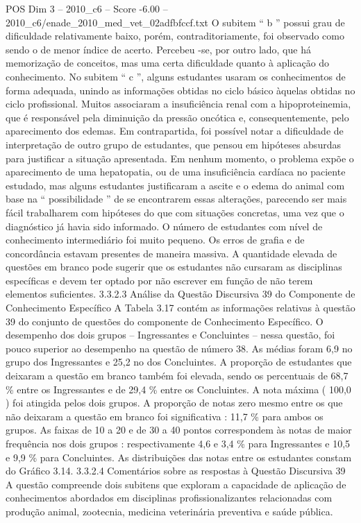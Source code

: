 \begin{textsample}{POS Dim 3 – 2010\_c6 – Score -6.00 – 2010\_c6/enade\_2010\_med\_vet\_02adfbfccf.txt}
O subitem “ b ” possui grau de dificuldade relativamente baixo, porém, contraditoriamente, foi observado como sendo o de menor índice de acerto.
Percebeu -se, por outro lado, que há memorização de conceitos, mas uma certa dificuldade quanto à aplicação do conhecimento.
No subitem “ c ”, alguns estudantes usaram os conhecimentos de forma adequada, unindo as informações obtidas no ciclo básico àquelas obtidas no ciclo profissional.
Muitos associaram a insuficiência renal com a hipoproteinemia, que é responsável pela diminuição da pressão oncótica e, consequentemente, pelo aparecimento dos edemas.
Em contrapartida, foi possível notar a dificuldade de interpretação de outro grupo de estudantes, que pensou em hipóteses absurdas para justificar a situação apresentada.
Em nenhum momento, o problema expõe o aparecimento de uma hepatopatia, ou de uma insuficiência cardíaca no paciente estudado, mas alguns estudantes justificaram a ascite e o edema do animal com base na “ possibilidade ” de se encontrarem essas alterações, parecendo ser mais fácil trabalharem com hipóteses do que com situações concretas, uma vez que o diagnóstico já havia sido informado.
O número de estudantes com nível de conhecimento intermediário foi muito pequeno.
Os erros de grafia e de concordância estavam presentes de maneira massiva.
A quantidade elevada de questões em branco pode sugerir que os estudantes não cursaram as disciplinas específicas e devem ter optado por não escrever em função de não terem elementos suficientes. 3.3.2.3 Análise da Questão Discursiva 39 do Componente de Conhecimento Específico A Tabela 3.17 contém as informações relativas à questão 39 do conjunto de questões do componente de Conhecimento Específico.
O desempenho dos dois grupos – Ingressantes e Concluintes – nessa questão, foi pouco superior ao desempenho na questão de número 38.
As médias foram 6,9 no grupo dos Ingressantes e 25,2 no dos Concluintes.
A proporção de estudantes que deixaram a questão em branco também foi elevada, sendo os percentuais de 68,7 \% entre os Ingressantes e de 29,4 \% entre os Concluintes.
A nota máxima ( 100,0 ) foi atingida pelos dois grupos.
A proporção de notas zero mesmo entre os que não deixaram a questão em branco foi significativa : 11,7 \% para ambos os grupos.
As faixas de 10 a 20 e de 30 a 40 pontos correspondem às notas de maior frequência nos dois grupos : respectivamente 4,6 e 3,4 \% para Ingressantes e 10,5 e 9,9 \% para Concluintes.
As distribuições das notas entre os estudantes constam do Gráfico 3.14. 3.3.2.4 Comentários sobre as respostas à Questão Discursiva 39 A questão compreende dois subitens que exploram a capacidade de aplicação de conhecimentos abordados em disciplinas profissionalizantes relacionadas com produção animal, zootecnia, medicina veterinária preventiva e saúde pública.

\end{textsample}
